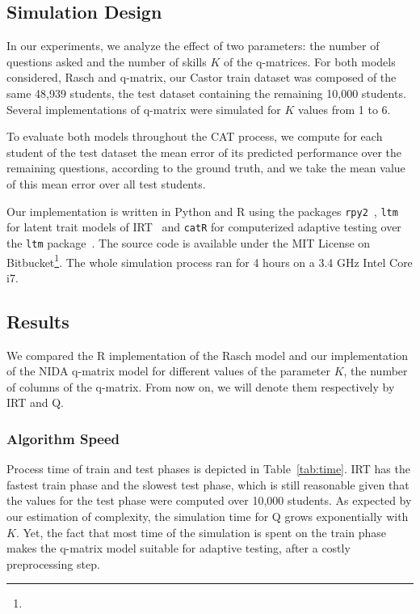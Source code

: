 \documentclass{sig-alternate}
\begin{document}
\subsection{Simulation Design}

In our experiments, we analyze the effect of two parameters: the number of questions asked and the number of skills $K$ of the q-matrices. For both models considered, Rasch and q-matrix, our Castor train dataset was composed of the same 48,939 students, the test dataset containing the remaining 10,000 students. Several implementations of q-matrix were simulated for $K$ values from 1 to 6.

To evaluate both models throughout the CAT process, we compute for each student of the test dataset the mean error of its predicted performance over the remaining questions, according to the ground truth, and we take the mean value of this mean error over all test students.

Our implementation is written in Python and R using the packages \texttt{rpy2}~\cite{Gautier2008}, \texttt{ltm} for latent trait models of IRT~\cite{Rizopoulos2006} and \texttt{catR} for computerized adaptive testing over the \texttt{ltm} package~\cite{MagisRaiche2012}. The source code is available under the MIT License on Bitbucket\footnote{}. The whole simulation process ran for 4 hours on a 3.4 GHz Intel Core i7.

\subsection{Results}

We compared the R implementation of the Rasch model and our implementation of the NIDA q-matrix model for different values of the parameter $K$, the number of columns of the q-matrix. From now on, we will denote them respectively by IRT and Q.

\subsubsection{Algorithm Speed}

Process time of train and test phases is depicted in Table~\ref{tab:time}. IRT has the fastest train phase and the slowest test phase, which is still reasonable given that the values for the test phase were computed over 10,000 students. As expected by our estimation of complexity, the simulation time for Q grows exponentially with $K$. Yet, the fact that most time of the simulation is spent on the train phase makes the q-matrix model suitable for adaptive testing, after a costly preprocessing step.
\end{document}

